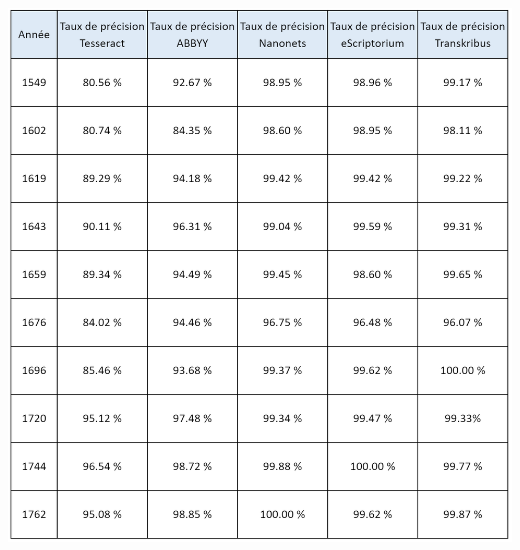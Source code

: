 \documentclass[a4paper,12pt,twoside]{book}
\begin{document}
\begin{table} [H]
\includegraphics[width=6in,height=6.63889in]{vertopal_157ae480aa4a4b07be198b586a812241/media/image23.png}
\end{table}
\end{document}
